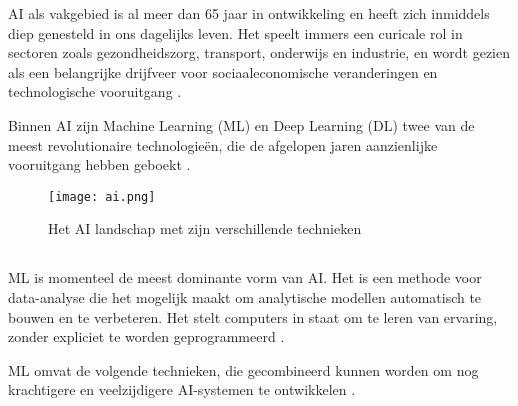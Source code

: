 \medskip

AI als vakgebied is al meer dan 65 jaar in ontwikkeling en heeft zich inmiddels diep genesteld in ons dagelijks leven. Het speelt immers een curicale rol in sectoren zoals gezondheidszorg, transport, onderwijs en industrie, en wordt gezien als een belangrijke drijfveer voor sociaaleconomische veranderingen en technologische vooruitgang \autocite{JiangEtAl2022}.

\medskip

Binnen AI zijn Machine Learning (ML) en Deep Learning (DL) twee van de meest revolutionaire technologieën, die de afgelopen jaren aanzienlijke vooruitgang hebben geboekt \autocite{SharifaniEtAl2023}.

\begin{figure}
  \centering
  \texttt{[image: ai.png]}
  \caption[AI landschap]{\label{fig:ai}Het AI landschap met zijn verschillende technieken \autocite{Kouassi2023}}
\end{figure}

\subsection{}%
\label{subsec:machine-learning}

ML is momenteel de meest dominante vorm van AI. Het is een methode voor data-analyse die het mogelijk maakt om analytische modellen automatisch te bouwen en te verbeteren. Het stelt computers in staat om te leren van ervaring, zonder expliciet te worden geprogrammeerd \autocite{SharifaniEtAl2023}.

\medskip

ML omvat de volgende technieken, die gecombineerd kunnen worden om nog krachtigere en veelzijdigere AI-systemen te ontwikkelen \autocite{Kouassi2023}. 

